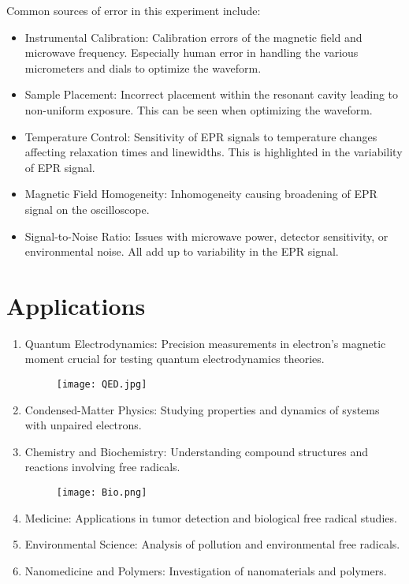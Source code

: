 \documentclass[11pt]{article}
\begin{document}
	Common sources of error in this experiment include:
	\begin{itemize}
		\item Instrumental Calibration: Calibration errors of the magnetic field and microwave frequency. Especially human error in handling the various micrometers and dials to optimize the waveform.
		\item Sample Placement: Incorrect placement within the resonant cavity leading to non-uniform exposure. This can be seen when optimizing the waveform.
		\item Temperature Control: Sensitivity of EPR signals to temperature changes affecting relaxation times and linewidths. This is highlighted in the variability of EPR signal.
		\item Magnetic Field Homogeneity: Inhomogeneity causing broadening of EPR signal on the oscilloscope.
		\item Signal-to-Noise Ratio: Issues with microwave power, detector sensitivity, or environmental noise. All add up to variability in the EPR signal.
	\end{itemize}
	
	
	
	\clearpage	
	
	\section{Applications}
	
	\begin{enumerate}
		\item Quantum Electrodynamics: Precision measurements in electron's magnetic moment crucial for testing quantum electrodynamics theories.
		\begin{figure}[htbp]
			\centering
			\texttt{[image: QED.jpg]}
			\label{fig:QED}
		\end{figure}
		\item Condensed-Matter Physics: Studying properties and dynamics of systems with unpaired electrons.
		\item Chemistry and Biochemistry: Understanding compound structures and reactions involving free radicals.
		\begin{figure}[htbp]
		\centering
		\texttt{[image: Bio.png]}
		\label{fig:Bio}
		\end{figure}
		\item Medicine: Applications in tumor detection and biological free radical studies.
		\item Environmental Science: Analysis of pollution and environmental free radicals.
		\item Nanomedicine and Polymers: Investigation of nanomaterials and polymers.
	\end{enumerate}
	
\end{document}
